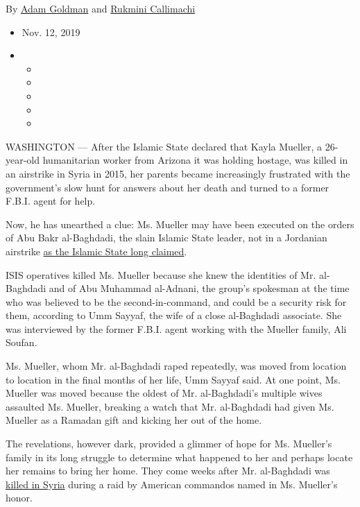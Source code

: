 By \href{https://www.nytimes3xbfgragh.onion/by/adam-goldman}{Adam
Goldman} and
\href{https://www.nytimes3xbfgragh.onion/by/rukmini-callimachi}{Rukmini
Callimachi}

\begin{itemize}
\item
  Nov. 12, 2019
\item
  \begin{itemize}
  \item
  \item
  \item
  \item
  \item
  \end{itemize}
\end{itemize}

WASHINGTON --- After the Islamic State declared that Kayla Mueller, a
26-year-old humanitarian worker from Arizona it was holding hostage, was
killed in an airstrike in Syria in 2015, her parents became increasingly
frustrated with the government's slow hunt for answers about her death
and turned to a former F.B.I. agent for help.

Now, he has unearthed a clue: Ms. Mueller may have been executed on the
orders of Abu Bakr al-Baghdadi, the slain Islamic State leader, not in a
Jordanian airstrike
\href{https://www.nytimes3xbfgragh.onion/2015/02/07/world/middleeast/isis-claims-american-hostage-killed-by-jordanian-retaliation-bombings.html}{as
the Islamic State long claimed}.

ISIS operatives killed Ms. Mueller because she knew the identities of
Mr. al-Baghdadi and of Abu Muhammad al-Adnani, the group's spokesman at
the time who was believed to be the second-in-command, and could be a
security risk for them, according to Umm Sayyaf, the wife of a close
al-Baghdadi associate. She was interviewed by the former F.B.I. agent
working with the Mueller family, Ali Soufan.

Ms. Mueller, whom Mr. al-Baghdadi raped repeatedly, was moved from
location to location in the final months of her life, Umm Sayyaf said.
At one point, Ms. Mueller was moved because the oldest of Mr.
al-Baghdadi's multiple wives assaulted Ms. Mueller, breaking a watch
that Mr. al-Baghdadi had given Ms. Mueller as a Ramadan gift and kicking
her out of the home.

The revelations, however dark, provided a glimmer of hope for Ms.
Mueller's family in its long struggle to determine what happened to her
and perhaps locate her remains to bring her home. They come weeks after
Mr. al-Baghdadi was
\href{https://www.nytimes3xbfgragh.onion/2019/10/27/us/politics/isis-leader-al-baghdadi-dead.html?module=inline}{killed
in Syria} during a raid by American commandos named in Ms. Mueller's
honor.

